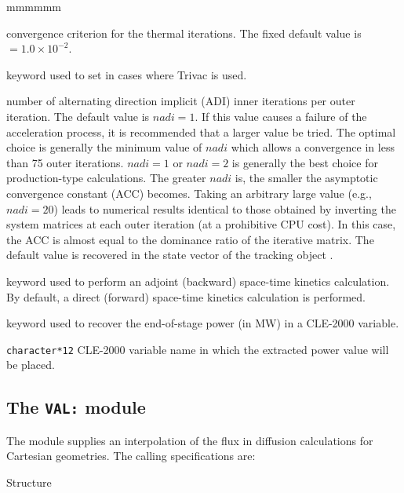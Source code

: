 \begin{ListeDeDescription}{mmmmmm}
\item[\dusa{epsthr}] convergence criterion for the thermal iterations. The
fixed default value is  $=1.0\times 10^{-2}$.

\item[\moc{ADI}] keyword used to set  in cases where Trivac is used.

\item[\dusa{nadi}] number of alternating direction implicit  (ADI) inner
iterations per outer iteration. The default value is $nadi=1$. If this value causes a failure of the acceleration process, it is recommended that a larger value be tried. The optimal
choice is generally the minimum value of $nadi$ which allows a convergence in
less than 75 outer iterations. $nadi=1$ or $nadi=2$ is generally the best
choice for production-type calculations. The greater $nadi$ is, the smaller 
the asymptotic convergence constant (ACC) becomes. Taking an arbitrary large
value (e.g., $nadi=20$) leads to numerical results identical to those obtained by
inverting the system matrices at each
outer iteration (at a prohibitive CPU cost). In this case, the ACC is almost
equal to the dominance ratio of the iterative matrix. The default value is
recovered in the state vector of the {\sc tracking} object .

\item[\moc{ADJ}] keyword used to perform an adjoint (backward) space-time kinetics calculation. By default, a direct (forward) space-time kinetics calculation
is performed.

\item[\moc{PICK}]  keyword used to recover the end-of-stage power (in MW) in a CLE-2000 variable.

\item[\dusa{power\_out}] \texttt{character*12} CLE-2000 variable name in which the extracted power value will be placed.

\end{ListeDeDescription}
\clearpage


\subsection{The {\tt VAL:} module}\label{sect:VALData}

The  module supplies an interpolation of the flux in diffusion calculations for
Cartesian geometries. The calling specifications are:

\begin{DataStructure}{Structure }
 \moc{:=}    \moc{::}  
\end{DataStructure}

